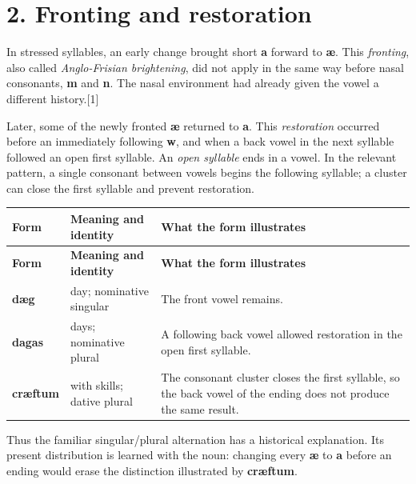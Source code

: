 \section*{2. Fronting and restoration}
In stressed syllables, an early change brought short \textbf{a} forward to \textbf{æ}. This \emph{fronting}, also called \emph{Anglo-Frisian brightening}, did not apply in the same way before nasal consonants, \textbf{m} and \textbf{n}. The nasal environment had already given the vowel a different history.[1]\par
Later, some of the newly fronted \textbf{æ} returned to \textbf{a}. This \emph{restoration} occurred before an immediately following \textbf{w}, and when a back vowel in the next syllable followed an open first syllable. An \emph{open syllable} ends in a vowel. In the relevant pattern, a single consonant between vowels begins the following syllable; a cluster can close the first syllable and prevent restoration.\par
\begingroup
\fontsize{10.5}{13.2}\selectfont
\setlength{\LTleft}{0pt}
\setlength{\LTright}{0pt plus 1fil}
\begin{longtable}{@{}>{\raggedright\arraybackslash}p{}>{\raggedright\arraybackslash}p{}>{\raggedright\arraybackslash}p{}@{}}
\toprule
\textbf{Form} & \textbf{Meaning and identity} & \textbf{What the form illustrates} \\
\midrule
\endfirsthead
\toprule
\textbf{Form} & \textbf{Meaning and identity} & \textbf{What the form illustrates} \\
\midrule
\endhead
\bottomrule
\endfoot
\bottomrule
\endlastfoot
\textbf{dæg} & day; nominative singular & The front vowel remains. \\
\textbf{dagas} & days; nominative plural & A following back vowel allowed restoration in the open first syllable. \\
\textbf{cræftum} & with skills; dative plural & The consonant cluster closes the first syllable, so the back vowel of the ending does not produce the same result. \\
\end{longtable}
\endgroup
Thus the familiar singular/plural alternation has a historical explanation. Its present distribution is learned with the noun: changing every \textbf{æ} to \textbf{a} before an ending would erase the distinction illustrated by \textbf{cræftum}.\par

